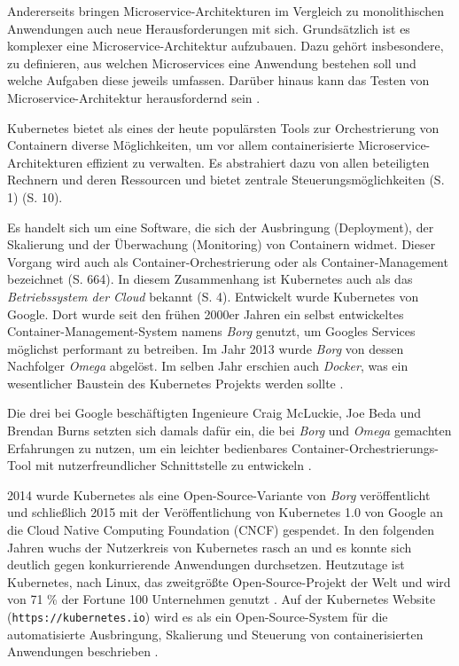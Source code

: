 \documentclass[11pt,a4paper]{article}
\begin{document}
Andererseits bringen Microservice-Architekturen im Vergleich zu monolithischen Anwendungen
auch neue Herausforderungen mit sich.
Grundsätzlich ist es komplexer eine Microservice-Architektur aufzubauen.
Dazu gehört insbesondere, zu definieren, aus welchen Microservices eine Anwendung bestehen soll
und welche Aufgaben diese jeweils umfassen. Darüber hinaus kann das Testen von Microservice-Architektur
herausfordernd sein \cite{8406008}.

Kubernetes bietet als eines der heute populärsten Tools zur Orchestrierung von Containern
diverse Möglichkeiten, um vor allem containerisierte Microservice-Architekturen effizient zu verwalten.
Es abstrahiert dazu von allen beteiligten Rechnern und deren Ressourcen und bietet zentrale Steuerungsmöglichkeiten
\cite{Schmeling_Dargatz_2022} (S. 1) \cite{cicd_with_kubernetes_devops} (S. 10).

Es handelt sich um eine Software, die sich der Ausbringung (Deployment),
der Skalierung und der Überwachung (Monitoring) von Containern widmet.
Dieser Vorgang wird auch als Container-Orchestrierung
oder als Container-Management bezeichnet \cite{Bisong2019} (S. 664).
In diesem Zusammenhang ist Kubernetes auch als das \emph{Betriebssystem der Cloud} bekannt
\cite{Schmeling_Dargatz_2022} (S. 4).
Entwickelt wurde Kubernetes von Google. Dort wurde seit den frühen 2000er Jahren
ein selbst entwickeltes Container-Management-System namens \emph{Borg} \cite{43438} genutzt,
um Googles Services möglichst performant zu betreiben.
Im Jahr 2013 wurde \emph{Borg} von dessen Nachfolger \emph{Omega} abgelöst. Im selben Jahr erschien auch \emph{Docker}, was ein wesentlicher Baustein des Kubernetes
Projekts werden sollte \cite{ibm_history}.

Die drei bei Google beschäftigten Ingenieure Craig McLuckie, Joe Beda und Brendan Burns setzten sich damals dafür ein,
die bei \emph{Borg} und \emph{Omega} gemachten Erfahrungen zu nutzen, um ein leichter bedienbares Container-Orchestrierungs-Tool
mit nutzerfreundlicher Schnittstelle zu entwickeln \cite{ibm_history}.

2014 wurde Kubernetes als eine Open-Source-Variante von \emph{Borg} veröffentlicht
und schließlich 2015 mit der Veröffentlichung von Kubernetes 1.0
von Google an die Cloud Native Computing Foundation (CNCF) gespendet.
In den folgenden Jahren wuchs der Nutzerkreis von Kubernetes
rasch an und es konnte sich deutlich gegen konkurrierende Anwendungen durchsetzen.
Heutzutage ist Kubernetes, nach Linux, das zweitgrößte Open-Source-Projekt der Welt und wird von 71 \% der Fortune 100 Unternehmen genutzt
\cite{ibm_history} \cite{kubernetes_journey}.
Auf der Kubernetes Website (\lstinline|https://kubernetes.io|)
wird es als ein Open-Source-System für die automatisierte Ausbringung, Skalierung
und Steuerung von containerisierten Anwendungen beschrieben \cite{kubernetes.io_start}.
\end{document}
